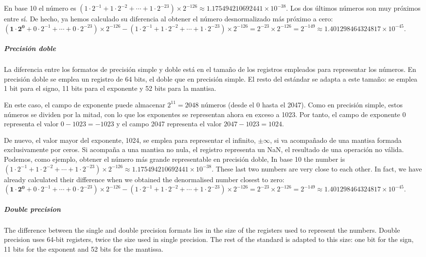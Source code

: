 \begin{paracol}{2}
En base 10 el número es $(1\cdot2^{-1}+1\cdot2^{-2}+\cdots+1\cdot2^{-23})\times2^{-126}\approx 1.175494210692441\times10^{-38}$. Los dos últimos números son muy próximos entre sí. De hecho, ya hemos calculado su diferencia al obtener el número desnormalizado más próximo a cero: $(\mathbf{1\cdot2^0}+0\cdot2^{-1}+\cdots+0\cdot2^{-23})\times 2^{-126}-(1\cdot2^{-1}+1\cdot2^{-2}+\cdots+1\cdot2^{-23})\times2^{-126}=2^{-23}\times 2^{-126}=2^{-149}\approx 1.401298464324817\times10^{-45}$.

\subparagraph*{Precisión doble}  La diferencia entre los formatos de precisión simple y doble está en el tamaño de los registros empleados para representar los números. En precisión doble se emplea un registro de 64 bits, el doble que en precisión simple. El resto del estándar se adapta a este tamaño: se emplea 1 bit para el signo, 11 bits para el exponente y 52 bits para la mantisa.

En este caso, el campo de exponente puede almacenar $2^{11}=2048$ números (desde el 0 hasta el 2047). Como en precisión simple, estos números se dividen por la mitad, con lo que los exponentes se representan ahora en exceso a 1023. Por tanto, el campo de exponente 0 representa el valor $0-1023=-1023$ y el campo 2047 representa el valor $2047-1023=1024$.

De nuevo, el valor mayor del exponente, 1024, se emplea para representar el infinito, $\pm\infty$, si va acompañado de una mantisa formada exclusivamente por ceros. Si acompaña a una mantisa no nula, el registro representa un NaN, el resultado de una operación no válida.  Podemos, como ejemplo, obtener el número más grande representable en precisión doble,
\switchcolumn
In base 10 the number is $(1\cdot2^{-1}+1\cdot2^{-2}+\cdots+1\cdot2^{-23})\times2^{-126}\approx 1.175494210692441\times10^{-38}$. These last two numbers are very close to each other. In fact, we have already calculated their difference when we obtained the denormalised number closest to zero: $(\mathbf{1\cdot2^0}+0\cdot2^{-1}+\cdots+0\cdot2^{-23})\times 2^{-126}-(1\cdot2^{-1}+1\cdot2^{-2}+\cdots+1\cdot2^{-23})\times2^{-126}=2^{-23}\times 2^{-126}=2^{-149}\approx 1.401298464324817\times10^{-45}$.

\subparagraph{Double precision}
 The difference between the single and double precision formats lies in the size of the registers used to represent the numbers. Double precision uses 64-bit registers, twice the size used in single precision. The rest of the standard is adapted to this size: one bit for the sign, 11 bits for the exponent and 52 bits for the mantissa.


\end{paracol}
